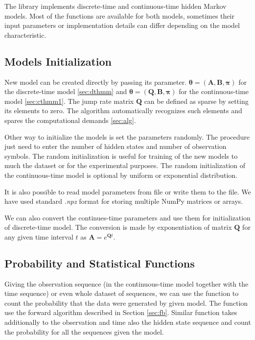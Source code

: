 \documentclass[thesis=M,english]{FITthesis}[2012/10/20]
\newcommand{\matr}[1]{\mathbf{#1}}
\begin{document}
The library implements discrete-time and continuous-time hidden Markov models. Most of the functions are available for both models, sometimes their input parameters or implementation details can differ depending on the model characteristic. 

\subsection{Models Initialization}

New model can be created directly by passing its parameter. $\boldsymbol\theta = ( \matr{A}, \matr{B}, \boldsymbol\pi )$ for the discrete-time model \ref{sec:dthmm} and $\boldsymbol\theta = ( \matr{Q}, \matr{B}, \boldsymbol\pi )$ for the continuous-time model \ref{sec:cthmm1}. The jump rate matrix $\matr{Q}$ can be defined as sparse by setting its elements to zero. The algorithm automatically recognizes such elements and spares the computational demands \ref{sec:alg}.

Other way to initialize the models is set the parameters randomly. The procedure just need to enter the number of hidden states and number of observation symbols. The random initialization is useful for training of the new models to much the dataset or for the experimental purposes. The random initialization of the continuous-time model is optional by uniform or exponential distribution.

It is also possible to read model parameters from file or write them to the file. We have used standard \textit{.npz} format for storing multiple NumPy matrices or arrays.      
 
We can also convert the continues-time parameters and use them for initialization of discrete-time model. The conversion is made by exponentiation of matrix $\matr{Q}$ for any given time interval $t$ as $\matr{A} = e^{\matr{Q}t}$. 
 
\subsection{Probability and Statistical Functions}

Giving the observation sequence (in the continuous-time model together with the time sequence) or even whole dataset of sequences, we can use the function to count the probability that the data were generated by given model. The function use the forward algorithm described in Section \ref{sec:fb}. Similar function takes additionally to the observation and time also the hidden state sequence and count the probability for all the sequences given the model.
\end{document}
